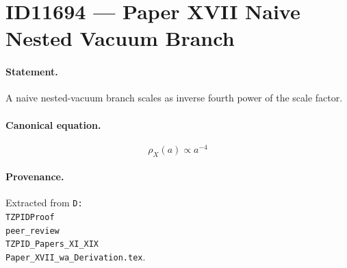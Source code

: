 \section*{ID11694 --- Paper XVII Naive Nested Vacuum Branch}

\paragraph{Statement.}
A naive nested-vacuum branch scales as inverse fourth power of the scale factor.

\paragraph{Canonical equation.}
\[
\rho_X(a)\propto a^{-4}
\]

\paragraph{Provenance.}
Extracted from \texttt{D:\\TZPIDProof\\peer\_review\\TZPID\_Papers\_XI\_XIX\\Paper\_XVII\_wa\_Derivation.tex}.
